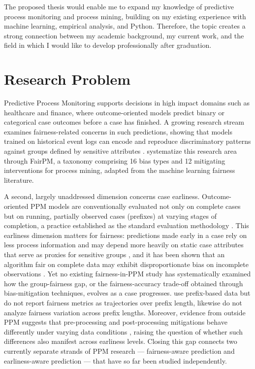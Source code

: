 \documentclass[authoryear,preprint,12pt]{elsarticle}
\begin{document}
The proposed thesis would enable me to expand my knowledge of predictive process monitoring and process mining, building on my existing experience with machine learning, empirical analysis, and Python. Therefore, the topic creates a strong connection between my academic background, my current work, and the field in which I would like to develop professionally after graduation.


\section{Research Problem}
Predictive Process Monitoring supports decisions in high impact domains such as healthcare and finance, where outcome-oriented models predict binary or categorical case outcomes before a case has finished. A growing research stream examines fairness-related concerns in such predictions, showing that models trained on historical event logs can encode and reproduce discriminatory patterns against groups defined by sensitive attributes \citep{Peeperkorn2025FairnessThroughIndependencePPM, LeoniFairnessInPPAnalyticsAdversarialLearning, KappelHumanintheLoopApproach}. \citet{Revoredo2025FairPM} systematize this research area through FairPM, a taxonomy comprising 16 bias types and 12 mitigating interventions for
process mining, adapted from the machine learning fairness literature.

A second, largely unaddressed dimension concerns case earliness. Outcome-oriented PPM models are conventionally evaluated not only on complete cases but on running, partially observed cases (prefixes) at varying stages of completion, a practice established as the standard evaluation methodology \citep{TemporalStabilityPPM}. This earliness dimension matters for fairness: predictions made early in a case rely on less process information and may depend more heavily on static case attributes that serve as proxies for sensitive groups \citep{SequenceEncodingsPPM}, and it has been shown that an algorithm fair on complete data may exhibit disproportionate bias on incomplete observations \citep{fairnessAndMissingData}. Yet no existing fairness-in-PPM study has systematically examined how the group-fairness gap, or the fairness-accuracy trade-off obtained through bias-mitigation techniques, evolves as a case progresses. \citet{Peeperkorn2025FairnessThroughIndependencePPM} use prefix-based data but do
not report fairness metrics as trajectories over prefix length, \citet{LeoniFairnessInPPAnalyticsAdversarialLearning, KappelHumanintheLoopApproach} likewise do not analyze fairness variation across prefix lengths. Moreover, evidence from outside PPM suggests that pre-processing and post-processing mitigations behave differently under varying data conditions \citet{SanchezMarques2026FairnessGlioma}, raising the question of whether such differences also manifest across earliness levels. Closing this gap connects two currently separate strands of PPM research — fairness-aware prediction \citep{Peeperkorn2025FairnessThroughIndependencePPM, LeoniFairnessInPPAnalyticsAdversarialLearning} and earliness-aware prediction \citep{TemporalStabilityPPM, TradeOffAccurancyVSEarliness} — that have so far been studied independently.
\end{document}
